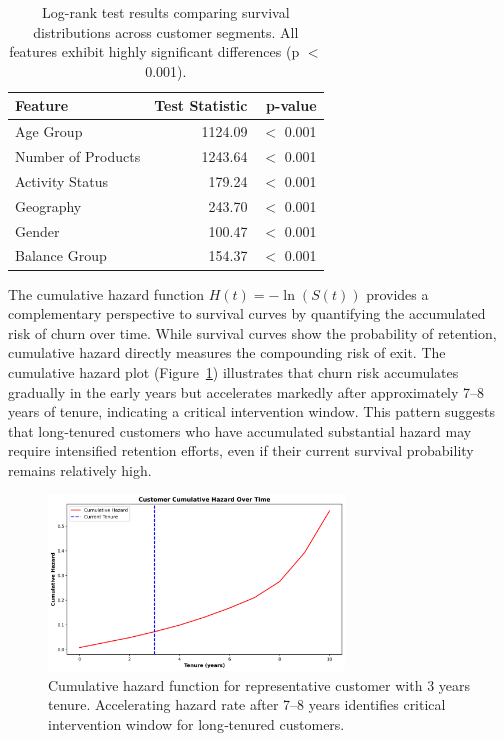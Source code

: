 \documentclass[12pt]{article}
\begin{document}
\begin{table}[H]
\centering
\small
\caption{Log-rank test results comparing survival distributions across customer segments. All features exhibit highly significant differences (p $<$ 0.001).}
\label{tab:logrank_results}
\begin{tabular}{lrr}
\toprule
\textbf{Feature} & \textbf{Test Statistic} & \textbf{p-value} \\
\midrule
Age Group & 1124.09 & $<$ 0.001 \\
Number of Products & 1243.64 & $<$ 0.001 \\
Activity Status & 179.24 & $<$ 0.001 \\
Geography & 243.70 & $<$ 0.001 \\
Gender & 100.47 & $<$ 0.001 \\
Balance Group & 154.37 & $<$ 0.001 \\
\bottomrule
\end{tabular}
\end{table}

The cumulative hazard function \(H(t) = -\ln(S(t))\) provides a complementary perspective to survival curves by quantifying the accumulated risk of churn over time.  While survival curves show the probability of retention, cumulative hazard directly measures the compounding risk of exit.  The cumulative hazard plot (Figure~\ref{fig:cumulative_hazard}) illustrates that churn risk accumulates gradually in the early years but accelerates markedly after approximately 7–8 years of tenure, indicating a critical intervention window.  This pattern suggests that long‑tenured customers who have accumulated substantial hazard may require intensified retention efforts, even if their current survival probability remains relatively high.

\begin{figure}[H]
\centering
\includegraphics[width=0.7\textwidth]{img/cumulative_hazard_plot.png}
\caption{Cumulative hazard function for representative customer with 3 years tenure. Accelerating hazard rate after 7–8 years identifies critical intervention window for long‑tenured customers.}
\label{fig:cumulative_hazard}
\end{figure}
\end{document}
